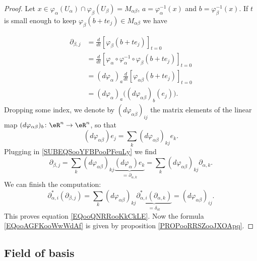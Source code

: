 \begin{proof}
	Let \( x\in \varphi_{\alpha}(U_{\alpha})\cap \varphi_{\beta}(U_\beta)=M_{\alpha\beta}\), \( a=\varphi_{\alpha}^{-1}(x)\) and \( b=\varphi_{\beta}^{-1}(x)\). If \( t\) is small enough to keep \( \varphi_{\beta}(b+te_j)\in M_{\alpha\beta}\) we have

	\begin{subequations}		\label{SUBEQSooYFBPooPFeuLy}
		\begin{align}
			\partial_{\beta,j} & =\frac{d}{dt} \left[ \varphi_{\beta}(b+te_j)  \right]_{t=0}                                                \\
			                   & =\frac{d}{dt} \left[ \varphi_{\alpha}\circ\varphi_{\alpha}^{-1}\circ\varphi_{\beta}(b+te_j)  \right]_{t=0} \\
			                   & =(d\varphi_{\alpha})_a\frac{d}{dt} \left[ \varphi_{\alpha\beta}(b+te_j)  \right]_{t=0}                     \\
			                   & =(d\varphi_{\alpha})_a\Big( (d\varphi_{\alpha\beta})_b(e_j) \Big).
		\end{align}
	\end{subequations}
	Dropping some index, we denote by \( (d\varphi_{\alpha\beta})_{ij}\) the matrix elements of the linear map \((d\varphi_{\alpha\beta})_b \colon \eR^n\to \eR^n  \), so that
	\begin{equation}
		(d\varphi_{\alpha\beta})e_j=\sum_k(d\varphi_{\alpha\beta})_{kj}e_k.
	\end{equation}
	Plugging in \eqref{SUBEQSooYFBPooPFeuLy} we find
	\begin{equation}
		\partial_{\beta,j}=\sum_k(d\varphi_{\alpha\beta})_{kj}\underbrace{(d\varphi_{\alpha})e_k}_{=\partial_{\alpha,k}}=\sum_k(d\varphi_{\alpha\beta})_{kj}\partial_{\alpha,k}.
	\end{equation}
	We can finish the computation:
	\begin{equation}
		\partial_{\alpha,i}^*(\partial_{\beta,j})=\sum_k(d\varphi_{\alpha\beta})_{kj}\underbrace{\partial_{\alpha,i}^*(\partial_{\alpha,k})}_{=\delta_{ik}}=(d\varphi_{\alpha\beta})_{ij}.
	\end{equation}
	This proves equation \eqref{EQooQNRRooKkCkLE}. Now the formula \eqref{EQooAGFKooWwWdAf} is given by proposition \ref{PROPooRRSZooJXOApq}.
\end{proof}

\subsection{Field of basis}


